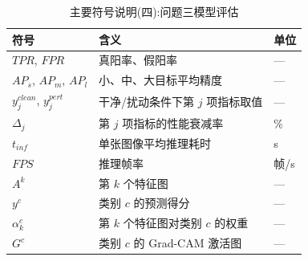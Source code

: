 \begin{table}[H]
\centering
\small
\renewcommand{\arraystretch}{1.0}
\setlength{\tabcolsep}{2.5pt}
\caption{主要符号说明(四):问题三模型评估}
\begin{tabular}{p{3.2cm}p{10.0cm}p{1.3cm}}
\toprule
符号 & 含义 & 单位 \\
\midrule
$TPR$, $FPR$ & 真阳率、假阳率 & — \\
$AP_s$, $AP_m$, $AP_l$ & 小、中、大目标平均精度 & — \\
$y_j^{clean}$, $y_j^{pert}$ & 干净/扰动条件下第 $j$ 项指标取值 & — \\
$\Delta_j$ & 第 $j$ 项指标的性能衰减率 & \% \\
$t_{inf}$ & 单张图像平均推理耗时 & s \\
$FPS$ & 推理帧率 & 帧/s \\
$A^k$ & 第 $k$ 个特征图 & — \\
$y^c$ & 类别 $c$ 的预测得分 & — \\
$\alpha_k^c$ & 第 $k$ 个特征图对类别 $c$ 的权重 & — \\
$G^c$ & 类别 $c$ 的 Grad-CAM 激活图 & — \\
\bottomrule
\end{tabular}
\end{table}

